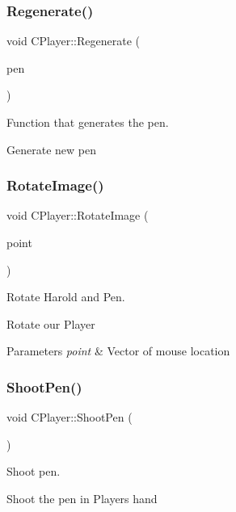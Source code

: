 \subsubsection{\texorpdfstring{Regenerate()}{Regenerate()}}
{\footnotesize\ttfamily void C\+Player\+::\+Regenerate (\begin{DoxyParamCaption}\item[{std\+::shared\+\_\+ptr$<$ \mbox{\hyperlink{class_c_pens}{C\+Pens}} $>$}]{pen }\end{DoxyParamCaption})}



Function that generates the pen. 

Generate new pen \mbox{\label{class_c_player_a5e44aa329b892f90bf8eb7aa38155d50}} 
\subsubsection{\texorpdfstring{RotateImage()}{RotateImage()}}
{\footnotesize\ttfamily void C\+Player\+::\+Rotate\+Image (\begin{DoxyParamCaption}\item[{C\+Point}]{point }\end{DoxyParamCaption})}



Rotate Harold and Pen. 

Rotate our Player 
\begin{DoxyParams}{Parameters}
{\em point} & Vector of mouse location \\
\hline
\end{DoxyParams}
\mbox{\label{class_c_player_a6cd750cb5f29c4d8615c936ab537a8c2}} 
\subsubsection{\texorpdfstring{ShootPen()}{ShootPen()}}
{\footnotesize\ttfamily void C\+Player\+::\+Shoot\+Pen (\begin{DoxyParamCaption}{ }\end{DoxyParamCaption})}



Shoot pen. 

Shoot the pen in Player\textquotesingle{}s hand \mbox{\label{class_c_player_a0a17b9e8c553dcf8a97b5ed6070ad560}} 
